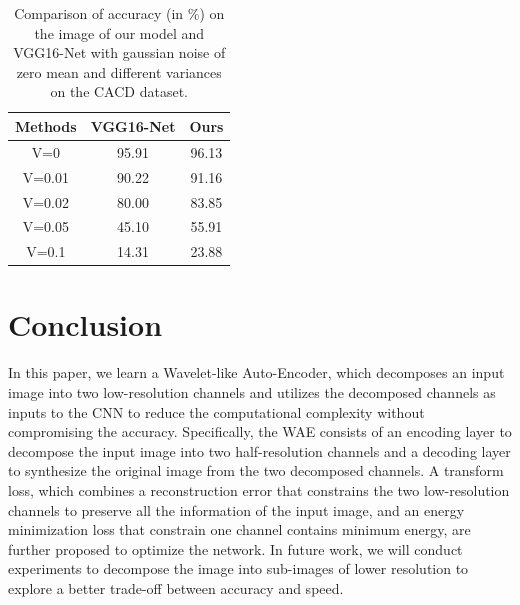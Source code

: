 \documentclass[letterpaper]{article} %
\begin{document}
\begin{table}[htbp]
\centering
\begin{tabular}{c|c|c}
\hline
Methods & VGG16-Net & Ours \\
\hline
V=0   & 95.91 & 96.13    \\
V=0.01   & 90.22  &  91.16     \\
V=0.02   & 80.00  &  83.85     \\
V=0.05   & 45.10  &  55.91     \\
V=0.1   & 14.31  &   23.88    \\
\hline
\end{tabular}
\caption{Comparison of accuracy (in \%) on the image of our model and VGG16-Net with gaussian noise of zero mean and different variances on the CACD dataset.}
\label{table:cacd_noise}
\end{table}


\section{Conclusion}
In this paper, we learn a Wavelet-like Auto-Encoder, which decomposes an input image into two low-resolution channels and utilizes the decomposed channels as inputs to the CNN to reduce the computational complexity without compromising the accuracy. Specifically, the WAE consists of an encoding layer to decompose the input image into two half-resolution channels and a decoding layer to synthesize the original image from the two decomposed channels. A transform loss, which combines a reconstruction error that constrains the two low-resolution channels to preserve all the information of the input image, and an energy minimization loss that constrain one channel contains minimum energy, are further proposed to optimize the network. 
In future work, we will conduct experiments to decompose the image into sub-images of lower resolution to explore a better trade-off between accuracy and speed.



\end{document}
